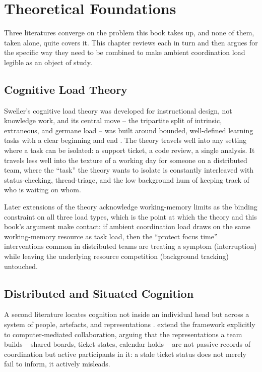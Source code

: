 \chapter{Theoretical Foundations}
\label{ch:literature}

Three literatures converge on the problem this book takes up, and none of
them, taken alone, quite covers it. This chapter reviews each in turn and
then argues for the specific way they need to be combined to make ambient
coordination load legible as an object of
study.

\section{Cognitive Load Theory}

Sweller's cognitive load theory was developed
for instructional design, not knowledge work, and its central move -- the
tripartite split of intrinsic, extraneous, and germane
load -- was built around bounded, well-defined learning
tasks with a clear beginning and end \citep{sweller1988cognitive}. The
theory travels well into any setting where a task can be isolated: a
support ticket, a code review, a single analysis. It travels less well into
the texture of a working day for someone on a distributed team, where the
``task'' the theory wants to isolate is constantly interleaved with
status-checking, thread-triage, and the low background hum of keeping track
of who is waiting on whom.

Later extensions of the theory acknowledge working-memory limits as the
binding constraint on all three load types, which is the point at which the
theory and this book's argument make contact: if ambient coordination load
draws on the same working-memory resource as task load, then the ``protect
focus time'' interventions common in distributed teams are treating a
symptom (interruption) while leaving the underlying resource competition
(background tracking) untouched.

\section{Distributed and Situated Cognition}

A second literature locates cognition not inside an individual head but
across a system of people, artefacts, and representations
\citep{hutchins1995cognition}. \citet{hollan2000distributed} extend the
framework explicitly to computer-mediated collaboration, arguing that the
representations a team builds -- shared boards, ticket states, calendar
holds -- are not passive records of coordination but active participants in
it: a stale ticket status does not merely fail to inform, it actively
misleads.


